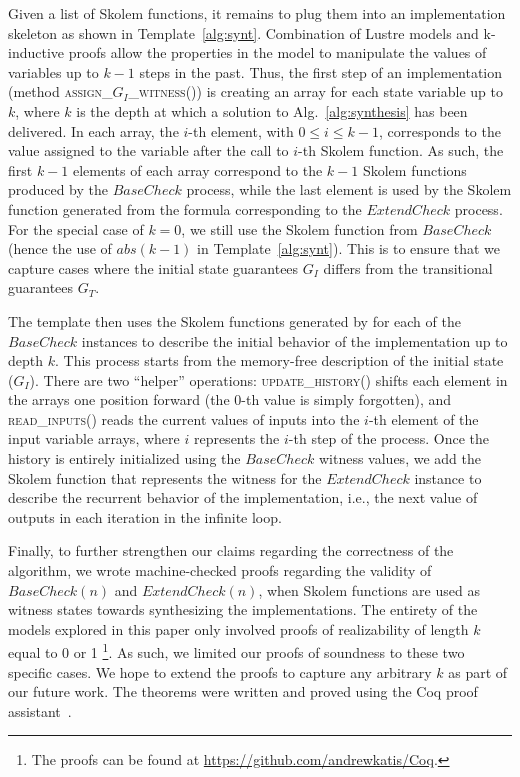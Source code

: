 Given a list of Skolem functions, it remains to plug them into
an implementation skeleton as shown in Template~\ref{alg:synt}. 
Combination of Lustre models and k-inductive proofs
allow the properties in the model to manipulate the
 values of variables up to $k-1$ steps in the past. Thus,
the first step of an implementation  (method \textsc{assign\_$G_{I}$\_witness()})
 is creating an array for each state variable up to $k$, where
$k$ is the depth at which a solution to Alg.~\ref{alg:synthesis} has been delivered.
In each array, the $i$-th element, with $0\leq i \leq k-1$,
corresponds to the value assigned to the variable after the call to
$i$-th Skolem function. As such, the first $k-1$ elements of each array
correspond to the $k-1$ Skolem functions produced by the
$\mathit{BaseCheck}$ process, while the last element is used by the
Skolem function generated from the formula corresponding to the
$\mathit{ExtendCheck}$ process. For the special case of $k=0$, we still use
the Skolem function from $\mathit{BaseCheck}$ (hence the use of
$\mathit{abs(k-1)}$ in Template~\ref{alg:synt}). This is to ensure that we
capture cases where the initial state guarantees $G_I$ differs from the
transitional guarantees $G_T$.

The template then uses the Skolem functions generated by \aeval for each
of the $\mathit{BaseCheck}$ instances to describe the initial behavior of
the implementation up to depth $k$.  This process starts from the memory-free
description of the initial state ($G_I$).
There are two ``helper'' operations:
\textsc{update\_history()} shifts each element in the arrays one position
forward (the 0-th value is simply forgotten), and \textsc{read\_inputs()} reads the
current values of inputs into the $i$-th element of the input variable arrays,
where $i$ represents the $i$-th step of the process.
Once the history is entirely initialized using the $\mathit{BaseCheck}$ witness values,
we add the Skolem function that represents the witness for the
$\mathit{ExtendCheck}$ instance to describe the recurrent behavior of the implementation, i.e.,
the next value of outputs in each iteration in the infinite loop.

Finally, to further strengthen our claims regarding the correctness of the algorithm,
we wrote machine-checked proofs regarding the validity of $\mathit{BaseCheck(n)}$ and
$\mathit{ExtendCheck(n)}$, when Skolem functions are used as witness states
towards synthesizing the implementations. The entirety of the models explored in
this paper only involved proofs of realizability of length $k$ equal to 0 or
1%
\footnote{The proofs can be found at \url{https://github.com/andrewkatis/Coq}.}.
As such, we limited our proofs of soundness to these two specific cases. We hope
to extend the proofs to capture any arbitrary $k$ as part of our future work.
The theorems were written and proved using the Coq proof
assistant~\cite{Coqmanual}.

